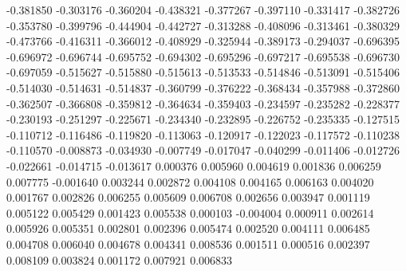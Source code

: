 -0.381850
-0.303176
-0.360204
-0.438321
-0.377267
-0.397110
-0.331417
-0.382726
-0.353780
-0.399796
-0.444904
-0.442727
-0.313288
-0.408096
-0.313461
-0.380329
-0.473766
-0.416311
-0.366012
-0.408929
-0.325944
-0.389173
-0.294037
-0.696395
-0.696972
-0.696744
-0.695752
-0.694302
-0.695296
-0.697217
-0.695538
-0.696730
-0.697059
-0.515627
-0.515880
-0.515613
-0.513533
-0.514846
-0.513091
-0.515406
-0.514030
-0.514631
-0.514837
-0.360799
-0.376222
-0.368434
-0.357988
-0.372860
-0.362507
-0.366808
-0.359812
-0.364634
-0.359403
-0.234597
-0.235282
-0.228377
-0.230193
-0.251297
-0.225671
-0.234340
-0.232895
-0.226752
-0.235335
-0.127515
-0.110712
-0.116486
-0.119820
-0.113063
-0.120917
-0.122023
-0.117572
-0.110238
-0.110570
-0.008873
-0.034930
-0.007749
-0.017047
-0.040299
-0.011406
-0.012726
-0.022661
-0.014715
-0.013617
0.000376
0.005960
0.004619
0.001836
0.006259
0.007775
-0.001640
0.003244
0.002872
0.004108
0.004165
0.006163
0.004020
0.001767
0.002826
0.006255
0.005609
0.006708
0.002656
0.003947
0.001119
0.005122
0.005429
0.001423
0.005538
0.000103
-0.004004
0.000911
0.002614
0.005926
0.005351
0.002801
0.002396
0.005474
0.002520
0.004111
0.006485
0.004708
0.006040
0.004678
0.004341
0.008536
0.001511
0.000516
0.002397
0.008109
0.003824
0.001172
0.007921
0.006833
